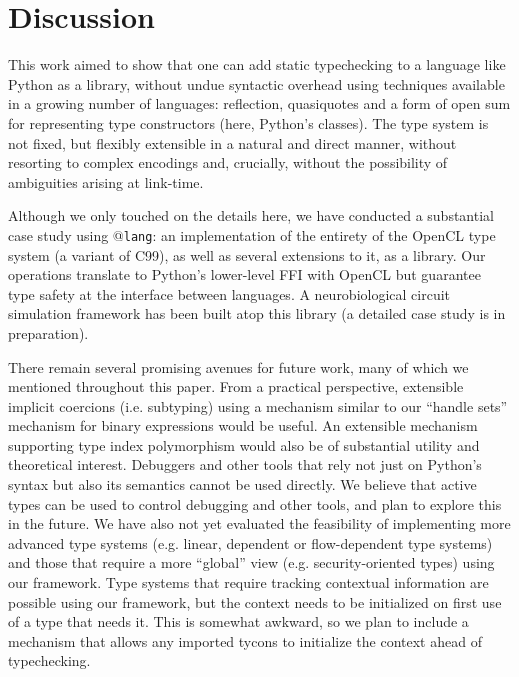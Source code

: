 \documentclass[9pt]{sigplanconf}
\begin{document}
\section{Discussion}\label{discussion}
This work aimed to show that one can add static typechecking to a language like Python as a library, without undue syntactic overhead using techniques available in a growing number of languages: reflection, quasiquotes and a form of open sum for representing type constructors (here, Python's classes). The type system is not fixed, but flexibly extensible in a natural and direct manner, without resorting to complex encodings and, crucially, without the possibility of ambiguities arising at link-time. 

Although we only touched on the details here, we have conducted a substantial case study using @\texttt{lang}: an implementation of the entirety of the OpenCL type system (a variant of C99), as well as several extensions to it, as a library. Our operations translate to Python's lower-level FFI with OpenCL but guarantee type safety at the interface between languages. A neurobiological circuit simulation framework has been built atop this library (a detailed case study is in preparation). %

There remain several promising avenues for future work, many of which we mentioned throughout this paper. From a practical perspective, extensible implicit coercions (i.e. subtyping) using a mechanism similar to our ``handle sets'' mechanism for binary expressions would be useful. An extensible mechanism supporting type index polymorphism would also be of substantial utility and theoretical interest. Debuggers and other tools that rely not just on Python's syntax but also its semantics cannot be used directly. We believe that active types can be used to control debugging and other tools, and plan to explore this in the future. We have also not yet evaluated the feasibility of implementing more advanced type systems (e.g. linear, dependent or flow-dependent type systems) and those that require a more ``global'' view (e.g. security-oriented types) using our framework. Type systems that require tracking contextual information are possible using our framework, but the context needs to be initialized on first use of a type that needs it. This is somewhat awkward, so we plan to include a mechanism that allows any imported tycons to initialize the context ahead of typechecking.
\end{document}
